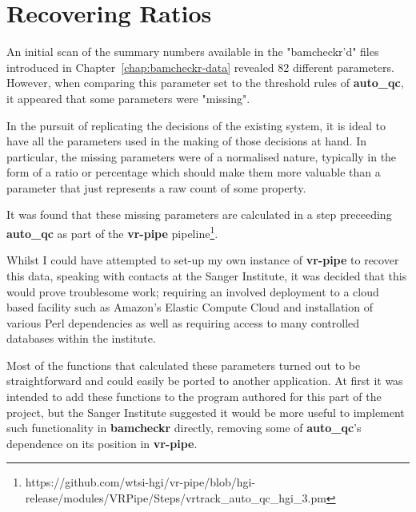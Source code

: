 \section{Recovering Ratios}
\label{app:ratios}

An initial scan of the summary numbers available in the "bamcheckr'd" files
introduced in Chapter~\ref{chap:bamcheckr-data} revealed 82 different
parameters. However, when comparing this parameter set to the threshold rules of
\textbf{auto\_qc}, it appeared that some parameters were "missing".

In the pursuit of replicating the decisions of the
existing system, it is ideal to have all the parameters used in the making of
those decisions at hand. In particular, the missing parameters were of a
normalised nature, typically in the form of a ratio or percentage which should
make them more valuable than a parameter that just represents a raw count of
some property.

It was found that these missing parameters are calculated in a step preceeding
\textbf{auto\_qc} as part of the \textbf{vr-pipe}
pipeline\footnote{https://github.com/wtsi-hgi/vr-pipe/blob/hgi-release/modules/VRPipe/Steps/vrtrack\_auto\_qc\_hgi\_3.pm}.


Whilst I could have attempted to set-up my own instance of \textbf{vr-pipe} to
recover this data, speaking with contacts at the Sanger Institute, it was
decided that this would prove troublesome work; requiring an involved
deployment to a cloud based facility such as Amazon's Elastic Compute Cloud and
installation of various Perl dependencies as well as requiring access to many
controlled databases within the institute.

Most of the functions that calculated these parameters turned out to be
straightforward and could easily be ported to another application. At first
it was intended to add these functions to the program authored for this part of
the project, but the Sanger Institute suggested it would be more useful to
implement such functionality in \textbf{bamcheckr} directly, removing some of
\textbf{auto\_qc}'s dependence on its position in \textbf{vr-pipe}.

